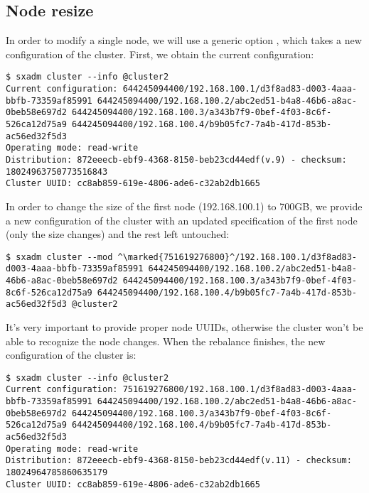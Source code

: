 \subsection{Node resize}
In order to modify a single node, we will use a generic option
, which takes a new configuration of the cluster.
First, we obtain the current configuration:
\begin{lstlisting}
$ sxadm cluster --info @cluster2
Current configuration: 644245094400/192.168.100.1/d3f8ad83-d003-4aaa-bbfb-73359af85991 644245094400/192.168.100.2/abc2ed51-b4a8-46b6-a8ac-0beb58e697d2 644245094400/192.168.100.3/a343b7f9-0bef-4f03-8c6f-526ca12d75a9 644245094400/192.168.100.4/b9b05fc7-7a4b-417d-853b-ac56ed32f5d3 
Operating mode: read-write
Distribution: 872eeecb-ebf9-4368-8150-beb23cd44edf(v.9) - checksum: 18024963750773516843
Cluster UUID: cc8ab859-619e-4806-ade6-c32ab2db1665
\end{lstlisting}
In order to change the size of the first node (192.168.100.1) to 700GB, we
provide a new configuration of the cluster with an updated specification of
the first node (only the size changes) and the rest left untouched:
\begin{lstlisting}
$ sxadm cluster --mod ^\marked{751619276800}^/192.168.100.1/d3f8ad83-d003-4aaa-bbfb-73359af85991 644245094400/192.168.100.2/abc2ed51-b4a8-46b6-a8ac-0beb58e697d2 644245094400/192.168.100.3/a343b7f9-0bef-4f03-8c6f-526ca12d75a9 644245094400/192.168.100.4/b9b05fc7-7a4b-417d-853b-ac56ed32f5d3 @cluster2
\end{lstlisting}
It's very important to provide proper node UUIDs, otherwise the cluster won't
be able to recognize the node changes. When the rebalance finishes, the new
configuration of the cluster is:
\begin{lstlisting}
$ sxadm cluster --info @cluster2
Current configuration: 751619276800/192.168.100.1/d3f8ad83-d003-4aaa-bbfb-73359af85991 644245094400/192.168.100.2/abc2ed51-b4a8-46b6-a8ac-0beb58e697d2 644245094400/192.168.100.3/a343b7f9-0bef-4f03-8c6f-526ca12d75a9 644245094400/192.168.100.4/b9b05fc7-7a4b-417d-853b-ac56ed32f5d3 
Operating mode: read-write
Distribution: 872eeecb-ebf9-4368-8150-beb23cd44edf(v.11) - checksum: 18024964785860635179
Cluster UUID: cc8ab859-619e-4806-ade6-c32ab2db1665
\end{lstlisting}

